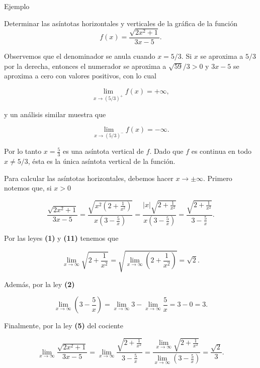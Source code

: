 \documentclass[
  letterpaper,
]{book}
\theoremstyle{plain}
\theoremstyle{remark}
\begin{document}
Ejemplo

Determinar las asíntotas horizontales y verticales de la gráfica de la
función \[
f(x)=\frac{\sqrt{2x^2+1}}{3x-5}.
\]

\begin{tcolorbox}[enhanced jigsaw, opacityback=0, left=2mm, opacitybacktitle=0.6, toprule=.15mm, bottomrule=.15mm, colbacktitle=quarto-callout-tip-color!10!white, titlerule=0mm, bottomtitle=1mm, title=\textcolor{quarto-callout-tip-color}{\faLightbulb}\hspace{0.5em}{Solución}, toptitle=1mm, colframe=quarto-callout-tip-color-frame, colback=white, breakable, rightrule=.15mm, arc=.35mm, leftrule=.75mm, coltitle=black]

Observemos que el denominador se anula cuando \(x=5/3\). Si \(x\) se
aproxima a \(5/3\) por la derecha, entonces el numerador se aproxima a
\(\sqrt{59}/3>0\) y \(3x-5\) se aproxima a cero con valores positivos,
con lo cual

\[
\lim_{x\to (5/3)^+} f(x)=+\infty,
\]

y un análisis similar muestra que

\[
\lim_{x\to (5/3)^-} f(x)=-\infty.
\]

Por lo tanto \(\displaystyle x=\frac{5}{3}\) es una asíntota vertical de
\(f\). Dado que \(f\) es continua en todo \(x\neq 5/3\), ésta es la
única asíntota vertical de la función.

Para calcular las asíntotas horizontales, debemos hacer
\(x\to \pm \infty\). Primero notemos que, si \(x>0\)

\[
\frac{\sqrt{2x^2+1}}{3x-5}=\frac{\sqrt{x^2\left(2+\frac{1}{x^2}\right)}}{x\left(3-\frac{5}{x}\right)}=\frac{|x|\sqrt{2+\frac{1}{x^2}}}{x\left(3-\frac{5}{x}\right)}=\frac{\sqrt{2+\frac{1}{x^2}}}{3-\frac{5}{x}}.
\]

Por las leyes \textbf{(1)} y \textbf{(11)} tenemos que

\[
\lim_{x\to \infty} \sqrt{2+\frac{1}{x^2}}=\sqrt{\lim_{x\to \infty} \left(2+\frac{1}{x^2}\right)}=\sqrt{2}.
\]

Además, por la ley \textbf{(2)}

\[
\lim_{x\to \infty} \left(3-\frac{5}{x}\right)=\lim_{x\to \infty} 3- \lim_{x\to \infty} \frac{5}{x}=3-0=3.
\]

Finalmente, por la ley \textbf{(5)} del cociente

\[
\lim_{x\to \infty} \frac{\sqrt{2x^2+1}}{3x-5}=\lim_{x\to\infty}\frac{\sqrt{2+\frac{1}{x^2}}}{3-\frac{5}{x}}=\frac{\lim_{x\to\infty} \sqrt{2+\frac{1}{x^2}}}{\lim_{x\to\infty}\left(3-\frac{5}{x}\right)}=\frac{\sqrt{2}}{3}.
\]


\end{tcolorbox}
\end{document}
